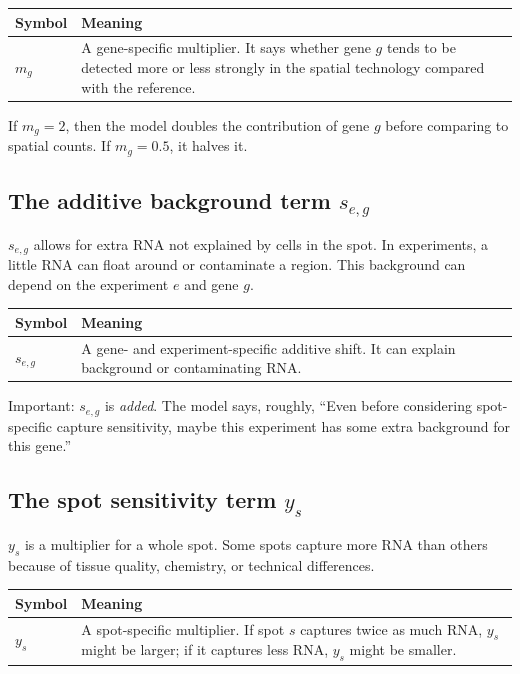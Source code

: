 \documentclass[11pt]{article}
\begin{document}
\begin{center}
\begin{tabularx}{0.95\textwidth}{>{\bfseries}p{}X}
\toprule
Symbol & Meaning \\
\midrule
$m_g$ & A gene-specific multiplier. It says whether gene $g$ tends to be detected more or less strongly in the spatial technology compared with the reference. \\
\bottomrule
\end{tabularx}
\end{center}

If $m_g=2$, then the model doubles the contribution of gene $g$ before comparing to spatial counts. If $m_g=0.5$, it halves it.

\subsection{The additive background term $s_{e,g}$}

$s_{e,g}$ allows for extra RNA not explained by cells in the spot. In experiments, a little RNA can float around or contaminate a region. This background can depend on the experiment $e$ and gene $g$.

\begin{center}
\begin{tabularx}{0.95\textwidth}{>{\bfseries}p{}X}
\toprule
Symbol & Meaning \\
\midrule
$s_{e,g}$ & A gene- and experiment-specific additive shift. It can explain background or contaminating RNA. \\
\bottomrule
\end{tabularx}
\end{center}

Important: $s_{e,g}$ is \emph{added}. The model says, roughly, ``Even before considering spot-specific capture sensitivity, maybe this experiment has some extra background for this gene.''

\subsection{The spot sensitivity term $y_s$}

$y_s$ is a multiplier for a whole spot. Some spots capture more RNA than others because of tissue quality, chemistry, or technical differences.

\begin{center}
\begin{tabularx}{0.95\textwidth}{>{\bfseries}p{}X}
\toprule
Symbol & Meaning \\
\midrule
$y_s$ & A spot-specific multiplier. If spot $s$ captures twice as much RNA, $y_s$ might be larger; if it captures less RNA, $y_s$ might be smaller. \\
\bottomrule
\end{tabularx}
\end{center}
\end{document}
